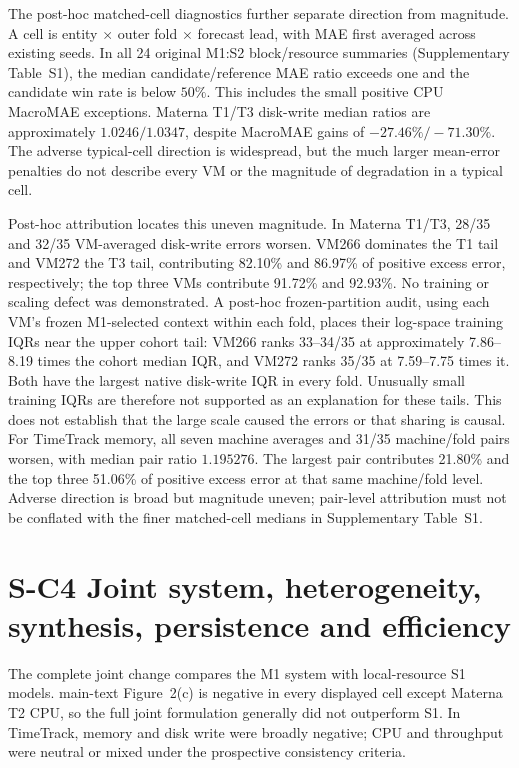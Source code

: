 \documentclass[a4paper,11pt]{article}
\begin{document}
The post-hoc matched-cell diagnostics further separate direction from
magnitude. A cell is entity $\times$ outer fold $\times$ forecast lead, with
MAE first averaged across existing seeds. In all 24 original M1:S2
block/resource summaries (Supplementary Table~S1), the median candidate/reference MAE ratio exceeds
one and the candidate win rate is below $50\%$. This includes the small
positive CPU MacroMAE exceptions. Materna T1/T3 disk-write median ratios are
approximately $1.0246/1.0347$, despite MacroMAE gains of
$-27.46\%/-71.30\%$. The adverse typical-cell direction is widespread, but
the much larger mean-error penalties do not describe every VM or the
magnitude of degradation in a typical cell.

Post-hoc attribution locates this uneven magnitude. In Materna T1/T3,
28/35 and 32/35 VM-averaged disk-write errors worsen. VM266 dominates the T1
tail and VM272 the T3 tail, contributing 82.10\% and 86.97\% of positive
excess error, respectively; the top three VMs contribute 91.72\% and 92.93\%.
No training or scaling defect was demonstrated. A post-hoc frozen-partition
audit, using each VM's frozen M1-selected context within each fold, places
their log-space training IQRs near the upper cohort tail: VM266 ranks
33--34/35 at approximately 7.86--8.19 times the cohort median IQR, and VM272
ranks 35/35 at 7.59--7.75 times it. Both have the largest native disk-write
IQR in every fold. Unusually small training IQRs are therefore not supported as an
explanation for these tails. This does not establish that the large scale
caused the errors or that sharing is causal.
For TimeTrack memory, all seven machine averages and 31/35 machine/fold
pairs worsen, with median pair ratio $1.195276$. The largest pair contributes
21.80\% and the top three 51.06\% of positive excess error at that same
machine/fold level. Adverse direction is broad but magnitude uneven;
pair-level attribution must not be
conflated with the finer matched-cell medians in Supplementary Table~S1.

\clearpage
\section*{S-C4 Joint system, heterogeneity, synthesis, persistence and efficiency}
The complete joint change compares the M1 system with local-resource S1
models.
main-text Figure~2(c) is negative in every displayed cell except
Materna T2 CPU, so the full joint formulation generally did not outperform S1.
In TimeTrack, memory and disk write were broadly negative; CPU and throughput
were neutral or mixed under the prospective consistency criteria.
\end{document}
